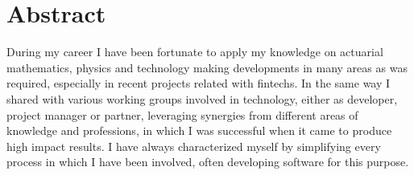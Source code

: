 \section{Abstract}

During my career I have been fortunate to apply my knowledge on actuarial mathematics, physics and technology making developments in many areas as was required, especially in recent projects related with fintechs. In the same way I shared with various working groups involved in technology, either as developer, project manager or partner, leveraging synergies from different areas of knowledge and professions, in which I was successful when it came to produce high impact results. I have always characterized myself by simplifying every process in which I have been involved, often developing software for this purpose.
